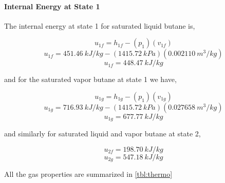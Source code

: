 \documentclass[10pt,parskip=half,
toc=sectionentrywithdots,
bibliography=totocnumbered,
captions=tableheading,numbers=noendperiod]{scrartcl}
\begin{document}
\hypertarget{internal-energy-at-state-1}{%
\paragraph{Internal Energy at State
1}\label{internal-energy-at-state-1}}

The internal energy at state 1 for saturated liquid butane is,

\begin{equation}u_{1f} = h_{1f} - (p_{1})(v_{1f})\end{equation}
\begin{equation}u_{1f} = 451.46\:kJ/kg - (1415.72\:kPa)(0.002110\:m^3/kg)\end{equation}
\begin{equation}u_{1f} = 448.47\:kJ/kg\end{equation}

and for the saturated vapor butane at state 1 we have,

\begin{equation}u_{1g} = h_{1g} - (p_{1})(v_{1g})\end{equation}
\begin{equation}u_{1g} = 716.93\:kJ/kg - (1415.72\:kPa)(0.027658\:m^3/kg)\end{equation}
\begin{equation}u_{1g} = 677.77\:kJ/kg\end{equation}

and similarly for saturated liquid and vapor butane at state 2,

\begin{equation}u_{2f} = 198.70\:kJ/kg\end{equation}
\begin{equation}u_{2g} = 547.18\:kJ/kg\end{equation}

All the gas properties are summarized in \cref{tbl:thermo}
\end{document}
